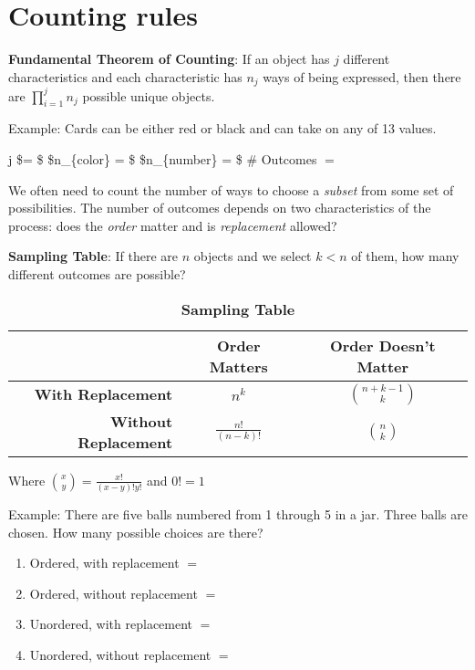\documentclass[]{book}
\providecommand{\tightlist}{%
  \setlength{\itemsep}{0pt}\setlength{\parskip}{0pt}}
\theoremstyle{definition}
\theoremstyle{definition}
\theoremstyle{definition}
\theoremstyle{remark}
\begin{document}
\section{Counting rules}\label{counting-rules}

\textbf{Fundamental Theorem of Counting}: If an object has \(j\)
different characteristics and each characteristic has \(n_j\) ways of
being expressed, then there are \(\prod_{i = 1}^j n_j\) possible unique
objects.

Example: Cards can be either red or black and can take on any of 13
values.

j \$= \$ \hspace{1.5cm} \$n\_\{color\} = \$ \hspace{1.5cm}
\$n\_\{number\} = \$ \hspace{1.5cm} \# Outcomes \(=\)

We often need to count the number of ways to choose a \textit{subset}
from some set of possibilities. The number of outcomes depends on two
characteristics of the process: does the \emph{order} matter and is
\emph{replacement} allowed?

\textbf{Sampling Table}: If there are \(n\) objects and we select
\(k < n\) of them, how many different outcomes are possible?

\begin{table}[h!]
\begin{center}
\caption*{\textbf{Sampling Table}}
\begin{tabular}{|r|c|c|}
\hline
& \textbf{Order Matters} & \textbf{Order Doesn't Matter}\\
\hline
\textbf{With Replacement} & $n^k$ & $\binom{n+k-1}{k}$\\
\hline
\textbf{Without Replacement} & $ \frac{n!}{(n-k)!}$ & $\binom{n}{k}$\\
\hline
\end{tabular}
\end{center}
\end{table}

Where \(\binom{x}{y} = \frac{x!}{(x-y)!y!}\) and \(0! = 1\)

Example: There are five balls numbered from 1 through 5 in a jar. Three
balls are chosen. How many possible choices are there?

\begin{enumerate}
\def\labelenumi{\arabic{enumi}.}
\tightlist
\item
  Ordered, with replacement \(=\)
\item
  Ordered, without replacement \(=\)
\item
  Unordered, with replacement \(=\)
\item
  Unordered, without replacement \(=\)
\end{enumerate}
\end{document}
